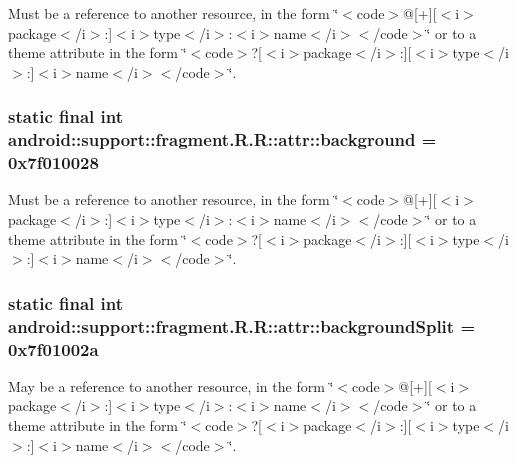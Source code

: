 Must be a reference to another resource, in the form \char`\"{}$<$code$>$@\mbox{[}+\mbox{]}\mbox{[}$<$i$>$package$<$/i$>$:\mbox{]}$<$i$>$type$<$/i$>$:$<$i$>$name$<$/i$>$$<$/code$>$\char`\"{} or to a theme attribute in the form \char`\"{}$<$code$>$?\mbox{[}$<$i$>$package$<$/i$>$:\mbox{]}\mbox{[}$<$i$>$type$<$/i$>$:\mbox{]}$<$i$>$name$<$/i$>$$<$/code$>$\char`\"{}. \hypertarget{classandroid_1_1support_1_1fragment_1_1_r_1_1attr_7b42612a387e34c9edc2b77a77e6cfab}{
\subsubsection[{background}]{\setlength{\rightskip}{0pt plus 5cm}static final int android::support::fragment.R.R::attr::background = 0x7f010028}}
\label{classandroid_1_1support_1_1fragment_1_1_r_1_1attr_7b42612a387e34c9edc2b77a77e6cfab}


Must be a reference to another resource, in the form \char`\"{}$<$code$>$@\mbox{[}+\mbox{]}\mbox{[}$<$i$>$package$<$/i$>$:\mbox{]}$<$i$>$type$<$/i$>$:$<$i$>$name$<$/i$>$$<$/code$>$\char`\"{} or to a theme attribute in the form \char`\"{}$<$code$>$?\mbox{[}$<$i$>$package$<$/i$>$:\mbox{]}\mbox{[}$<$i$>$type$<$/i$>$:\mbox{]}$<$i$>$name$<$/i$>$$<$/code$>$\char`\"{}. \hypertarget{classandroid_1_1support_1_1fragment_1_1_r_1_1attr_df8b8306705634732eff471247006a04}{
\subsubsection[{backgroundSplit}]{\setlength{\rightskip}{0pt plus 5cm}static final int android::support::fragment.R.R::attr::backgroundSplit = 0x7f01002a}}
\label{classandroid_1_1support_1_1fragment_1_1_r_1_1attr_df8b8306705634732eff471247006a04}


May be a reference to another resource, in the form \char`\"{}$<$code$>$@\mbox{[}+\mbox{]}\mbox{[}$<$i$>$package$<$/i$>$:\mbox{]}$<$i$>$type$<$/i$>$:$<$i$>$name$<$/i$>$$<$/code$>$\char`\"{} or to a theme attribute in the form \char`\"{}$<$code$>$?\mbox{[}$<$i$>$package$<$/i$>$:\mbox{]}\mbox{[}$<$i$>$type$<$/i$>$:\mbox{]}$<$i$>$name$<$/i$>$$<$/code$>$\char`\"{}. 


